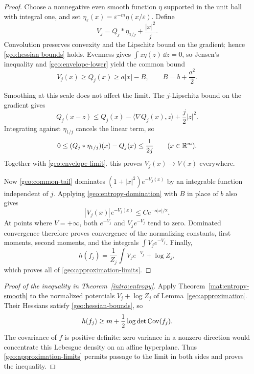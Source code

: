 \begin{proof}
Choose a nonnegative even smooth function $\eta$ supported in the unit ball
with integral one, and set $\eta_\varepsilon(x)=\varepsilon^{-m}
\eta(x/\varepsilon)$.  Define
\begin{equation}\label{geo:smooth-potentials}
  V_j=Q_j*\eta_{1/j}+\frac{|x|^2}j.
\end{equation}
Convolution preserves convexity and the Lipschitz bound on the gradient;
hence \eqref{geo:hessian-bounds} holds.  Evenness gives
$\int z\eta(z)\,\dd z=0$, so Jensen's inequality and
\eqref{geo:envelope-lower} yield the common bound
\begin{equation}\label{geo:common-tail}
  V_j(x)\geq Q_j(x)\geq a|x|-B,
  \qquad B=b+\frac{a^2}2.
\end{equation}

Smoothing at this scale does not affect the limit.  The $j$-Lipschitz
bound on the gradient gives
\[
  Q_j(x-z)\leq Q_j(x)-\langle\nabla Q_j(x),z\rangle+\frac j2|z|^2.
\]
Integrating against $\eta_{1/j}$ cancels the linear term, so
\[
  0\leq (Q_j*\eta_{1/j})(x)-Q_j(x)\leq\frac1{2j}
  \qquad(x\in\mathbb R^m).
\]
Together with \eqref{geo:envelope-limit}, this proves
$V_j(x)\to V(x)$ everywhere.

Now \eqref{geo:common-tail} dominates $(1+|x|^2)e^{-V_j(x)}$ by an
integrable function independent of $j$.  Applying
\eqref{geo:entropy-domination} with $B$ in place of $b$ also gives
\[
  |V_j(x)|e^{-V_j(x)}\leq C e^{-a|x|/2}.
\]
At points where $V=+\infty$, both $e^{-V_j}$ and $V_je^{-V_j}$ tend to
zero.  Dominated convergence therefore proves convergence of the
normalizing constants, first moments, second moments, and the integrals
$\int V_je^{-V_j}$.  Finally,
\[
  h(f_j)=\frac1{Z_j}\int V_je^{-V_j}+\log Z_j,
\]
which proves all of \eqref{geo:approximation-limits}.
\end{proof}

\begin{proof}[Proof of the inequality in Theorem~\ref{intro:entropy}]
Apply Theorem~\ref{mat:entropy-smooth} to the normalized potentials
$V_j+\log Z_j$ of Lemma~\ref{geo:approximation}.  Their Hessians satisfy
\eqref{geo:hessian-bounds}, so
\[
  h(f_j)\geq m+\frac12\log\det\operatorname{Cov}(f_j).
\]
The covariance of $f$ is positive definite: zero variance in a nonzero
direction would concentrate this Lebesgue density on an affine hyperplane.
Thus \eqref{geo:approximation-limits} permits passage to the limit in both
sides and proves the inequality.
\end{proof}

